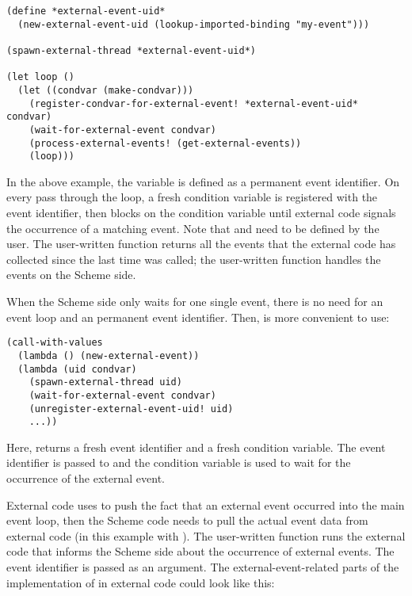 \begin{verbatim}
(define *external-event-uid* 
  (new-external-event-uid (lookup-imported-binding "my-event")))

(spawn-external-thread *external-event-uid*)

(let loop ()
  (let ((condvar (make-condvar)))
    (register-condvar-for-external-event! *external-event-uid* condvar)
    (wait-for-external-event condvar)
    (process-external-events! (get-external-events))
    (loop)))
\end{verbatim}

\noindent{}In the above example, the variable
 is defined as a permanent event
identifier.  On every pass through the loop, a fresh condition
variable is registered with the event identifier, then
 blocks on the condition variable until
external code signals the occurrence of a matching event.  Note that
 and  need to
be defined by the user.  The user-written function
 returns all the events that the external
code has collected since the last time  was
called; the user-written function 
handles the events on the Scheme side.

When the Scheme side only waits for one single event, there is no need
for an event loop and an permanent event identifier.  Then,
 is more convenient to use:

\begin{verbatim}
(call-with-values
  (lambda () (new-external-event))
  (lambda (uid condvar)
    (spawn-external-thread uid)
    (wait-for-external-event condvar)
    (unregister-external-event-uid! uid)
    ...))
\end{verbatim}

\noindent{}Here,  returns a fresh event
identifier and a fresh condition variable.  The event identifier is
passed to  and the condition variable is
used to wait for the occurrence of the external event.

External code uses  to push the fact
that an external event occurred into the main event loop, then the
Scheme code needs to pull the actual event data from external code (in
this example with ).  The user-written
function  runs the external code that
informs the Scheme side about the occurrence of external events.  The
event identifier is passed as an argument.  The external-event-related
parts of the implementation of  in
external code could look like this:

